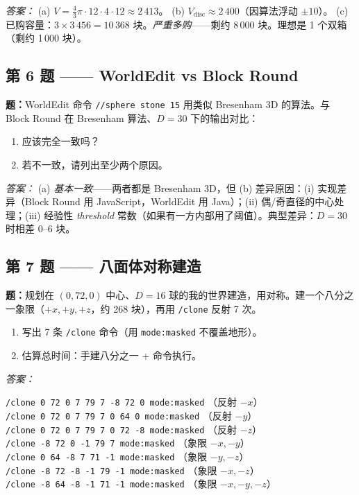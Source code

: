 \documentclass[12pt,a4paper]{scrartcl}
\newcommand{\cmd}[1]{\textcolor{earth}{\texttt{\small #1}}}
\begin{document}
\emph{答案：}
(a) $V = \tfrac{4}{3}\pi \cdot 12 \cdot 4 \cdot 12 \approx 2\,413$。
(b) $V_{\mathrm{disc}} \approx 2\,400$（因算法浮动 $\pm 10$）。
(c) 已购容量：$3 \times 3\,456 = 10\,368$ 块。\emph{严重多购}——剩约 8\,000 块。理想是 1 个双箱（剩约 1\,000 块）。

\subsection*{第 6 题 —— WorldEdit vs Block Round}
\textbf{题：}WorldEdit 命令 \cmd{//sphere stone 15} 用类似 Bresenham 3D 的算法。与 Block Round 在 Bresenham 算法、$D = 30$ 下的输出对比：
\begin{enumerate}[label=\alph*),leftmargin=1.5em,itemsep=0.1em,topsep=0.2em,nosep]
  \item 应该完全一致吗？
  \item 若不一致，请列出至少两个原因。
\end{enumerate}

\emph{答案：}
(a) \emph{基本一致}——两者都是 Bresenham 3D，但 (b) 差异原因：(i) 实现差异（Block Round 用 JavaScript，WorldEdit 用 Java）；(ii) 偶/奇直径的中心处理；(iii) 经验性 \emph{threshold} 常数（如果有一方内部用了阈值）。典型差异：$D = 30$ 时相差 0--6 块。

\subsection*{第 7 题 —— 八面体对称建造}
\textbf{题：}规划在 $(0, 72, 0)$ 中心、$D = 16$ 球的我的世界建造，用对称。建一个八分之一象限（$+x, +y, +z$，约 268 块），再用 \cmd{/clone} 反射 7 次。
\begin{enumerate}[label=\alph*),leftmargin=1.5em,itemsep=0.1em,topsep=0.2em,nosep]
  \item 写出 7 条 \cmd{/clone} 命令（用 \cmd{mode:masked} 不覆盖地形）。
  \item 估算总时间：手建八分之一 + 命令执行。
\end{enumerate}

\emph{答案：}

\begin{minecraft}[命令序列]
\cmd{/clone 0 72 0 7 79 7 -8 72 0 mode:masked} \quad （反射 $-x$）\\
\cmd{/clone 0 72 0 7 79 7 0 64 0 mode:masked} \quad\quad （反射 $-y$）\\
\cmd{/clone 0 72 0 7 79 7 0 72 -8 mode:masked} \quad （反射 $-z$）\\
\cmd{/clone -8 72 0 -1 79 7 mode:masked} \quad\quad\;\; （象限 $-x,-y$）\\
\cmd{/clone 0 64 -8 7 71 -1 mode:masked} \quad\quad\;\; （象限 $-y,-z$）\\
\cmd{/clone -8 72 -8 -1 79 -1 mode:masked} \quad\;\; （象限 $-x,-z$）\\
\cmd{/clone -8 64 -8 -1 71 -1 mode:masked} \quad\;\; （象限 $-x,-y,-z$）
\end{minecraft}
\end{document}
